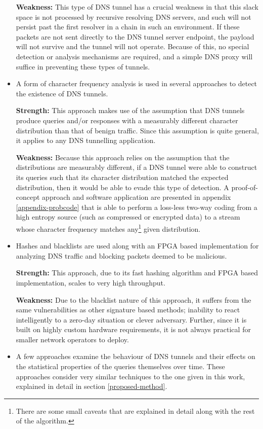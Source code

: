 \documentclass[12pt]{report}
\theoremstyle{remark}
\theoremstyle{definition}
\theoremstyle{definition}
\theoremstyle{definition}
\begin{document}
\begin{itemize}
\textbf{Weakness:} This type of DNS tunnel has a crucial weakness in that this
slack space is not processed by recursive resolving DNS servers, and such will
not persist past the first resolver in a chain in such an environment. If these
packets are not sent directly to the DNS tunnel server endpoint, the payload
will not survive and the tunnel will not operate. Because of this, no special
detection or analysis mechanisms are required, and a simple DNS proxy will
suffice in preventing these types of tunnels.

\item A form of character frequency analysis is used in several approaches to
detect the existence of DNS tunnels.

\textbf{Strength:} This approach makes use of the assumption that DNS tunnels
produce queries and/or responses with a measurably different character
distribution than that of benign traffic. Since this assumption is quite
general, it applies to any DNS tunnelling application.

\textbf{Weakness:} Because this approach relies on the assumption that the
distributions are measurably different, if a DNS tunnel were able to construct
its queries such that its character distribution matched the expected
distribution, then it would be able to evade this type of detection. A
proof-of-concept approach and software application are presented in appendix
\ref{appendix-probcode} that is able to perform a loss-less two-way coding from a high
entropy source (such as compressed or encrypted data) to a stream whose
character frequency matches any\footnote{There are some small caveats that are
explained in detail along with the rest of the algorithm.} given distribution.

\item Hashes and blacklists are used along with an FPGA based implementation for 
analyzing DNS traffic and blocking packets deemed to be malicious.

\textbf{Strength:} This approach, due to its fast hashing algorithm and FPGA
based implementation, scales to very high throughput.

\textbf{Weakness:} Due to the blacklist nature of this approach, it suffers from
the same vulnerabilities as other signature based methods; inability to react
intelligently to a zero-day situation or clever adversary. Further, since it is
built on highly custom hardware requirements, it is not always practical for
smaller network operators to deploy.

\item A few approaches examine the behaviour of DNS tunnels and their effects on
the statistical properties of the queries themselves over time. These approaches
consider very similar techniques to the one given in this work, explained in
detail in section \ref{proposed-method}.


\end{itemize}
\end{document}
